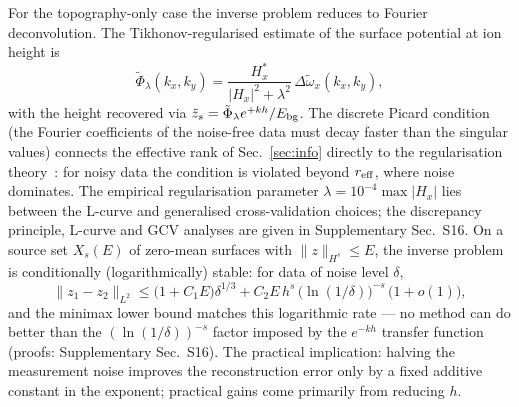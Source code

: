 \documentclass[12pt,a4paper]{article}
\begin{document}
For the topography-only case the inverse problem reduces to Fourier
deconvolution.  The Tikhonov-regularised estimate of the surface potential
at ion height is
\begin{equation}
\tilde{\Phi}_\lambda(k_x,k_y) = \frac{H_x^*}{|H_x|^2 + \lambda^2}\,
    \Delta\tilde{\omega}_x(k_x,k_y),
\label{eq:tikhonov}
\end{equation}
with the height recovered via
$\tilde{z}_s=\tilde{\Phi}_\lambda e^{+kh}/E_{\rm bg}$.  The discrete
Picard condition (the Fourier coefficients of the noise-free data must
decay faster than the singular values) connects the effective rank of
Sec.~\ref{sec:info} directly to the regularisation
theory~\cite{bertero1998introduction}: for noisy data
the condition is violated beyond $r_{\rm eff}$, where noise dominates.
The empirical regularisation parameter $\lambda=10^{-4}\max|H_x|$ lies
between the L-curve and generalised cross-validation choices; the
discrepancy principle, L-curve and GCV analyses are given in
Supplementary Sec.~S16.  On a source set $X_s(E)$ of zero-mean surfaces
with $\|z\|_{H^s}\le E$, the inverse problem is conditionally
(logarithmically) stable: for data of noise level $\delta$,
\begin{equation}
\|z_1-z_2\|_{L^2} \le \bigl(1+C_1E\bigr)\delta^{1/3}
    + C_2 E\,h^{s}\,\bigl(\ln(1/\delta)\bigr)^{-s}\,\bigl(1+o(1)\bigr),
\label{eq:cond_stability_rate}
\end{equation}
and the minimax lower bound matches this logarithmic rate --- no method
can do better than the $(\ln(1/\delta))^{-s}$ factor imposed by the
$e^{-kh}$ transfer function~\cite{engl1996inverse,hohage2000regularization}
(proofs: Supplementary Sec.~S16).  The practical implication: halving the
measurement noise improves the reconstruction error only by a fixed
additive constant in the exponent; practical gains come primarily from
reducing $h$.
\end{document}
